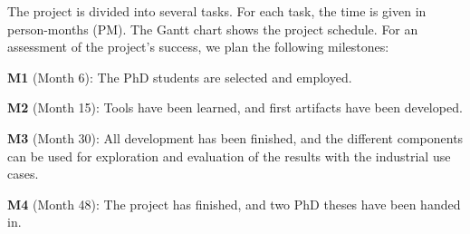 \documentclass[fleqn,12pt]{article}
\begin{document}
%
%
%


The project is divided into several tasks.
For each task, the time is given in person-months (PM). The Gantt chart shows
the project schedule.
For an assessment of the project's success, we plan the following milestones:

\textbf{M1} (Month 6): The PhD students are selected and employed.

\textbf{M2} (Month 15): Tools have been learned, and first artifacts have been developed.

\textbf{M3} (Month 30): All development has been finished, and the different components
can be used for exploration and evaluation of the results with the industrial use cases.

\textbf{M4} (Month 48): The project has finished, and two PhD theses have been handed in.
\end{document}
